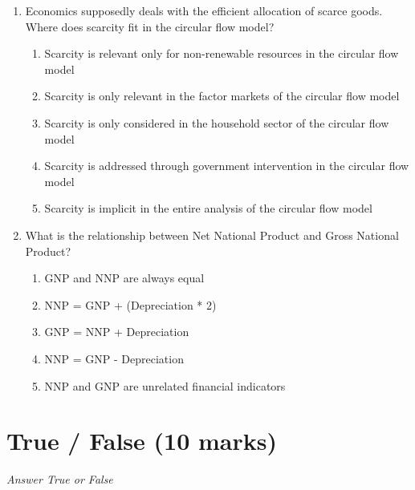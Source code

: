 \documentclass[12pt]{article}
\begin{document}
\begin{enumerate}[label=\arabic*.]
\begin{enumerate}[label=(\alph*)]
    \item A trade agreement between Europe and Asia to promote intercontinental commerce
\end{enumerate}
\item Economics supposedly deals with the efficient allocation of scarce goods. Where does scarcity fit in the circular flow model?
\begin{enumerate}[label=(\alph*)]
    \item Scarcity is relevant only for non-renewable resources in the circular flow model
    \item Scarcity is only relevant in the factor markets of the circular flow model
    \item Scarcity is only considered in the household sector of the circular flow model
    \item Scarcity is addressed through government intervention in the circular flow model
    \item Scarcity is implicit in the entire analysis of the circular flow model
\end{enumerate}
\item What is the relationship between Net National Product and Gross National Product?
\begin{enumerate}[label=(\alph*)]
    \item GNP and NNP are always equal
    \item NNP = GNP + (Depreciation * 2)
    \item GNP = NNP + Depreciation
    \item NNP = GNP - Depreciation
    \item NNP and GNP are unrelated financial indicators
\end{enumerate}
\end{enumerate}

\section*{True / False (10 marks)}
\textit{Answer True or False}
\end{document}
